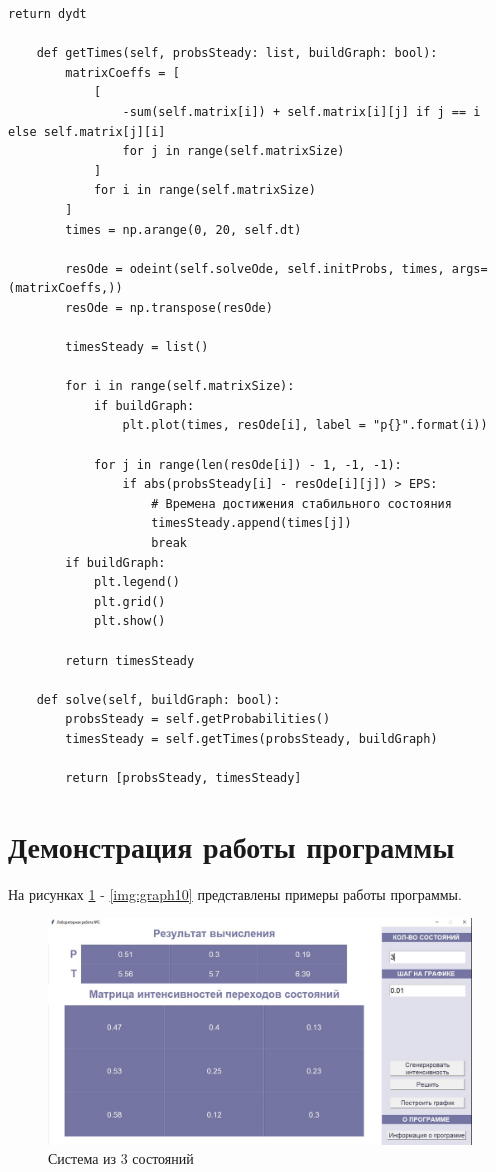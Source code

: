 \begin{lstlisting}[label=lst:markovChains, caption=class MarkovChains]
        return dydt

    def getTimes(self, probsSteady: list, buildGraph: bool):
        matrixСoeffs = [
            [
                -sum(self.matrix[i]) + self.matrix[i][j] if j == i else self.matrix[j][i] 
                for j in range(self.matrixSize)
            ]
            for i in range(self.matrixSize)
        ]
        times = np.arange(0, 20, self.dt)
    
        resOde = odeint(self.solveOde, self.initProbs, times, args=(matrixСoeffs,))
        resOde = np.transpose(resOde)

        timesSteady = list()

        for i in range(self.matrixSize):
            if buildGraph:
                plt.plot(times, resOde[i], label = "p{}".format(i))

            for j in range(len(resOde[i]) - 1, -1, -1):
                if abs(probsSteady[i] - resOde[i][j]) > EPS:
                    # Времена достижения стабильного состояния
                    timesSteady.append(times[j])
                    break
        if buildGraph:
            plt.legend()
            plt.grid()
            plt.show()

        return timesSteady

    def solve(self, buildGraph: bool):
        probsSteady = self.getProbabilities()
        timesSteady = self.getTimes(probsSteady, buildGraph)

        return [probsSteady, timesSteady]
\end{lstlisting}

\clearpage

\section{Демонстрация работы программы}

На рисунках \ref{img:matrix3} - \ref{img:graph10} представлены примеры работы программы.

\begin{figure}[h]
    \centering
    \includegraphics[scale = 0.4]{img/3.jpg}
    \caption{Система из 3 состояний}
    \label{img:matrix3}
\end{figure}

